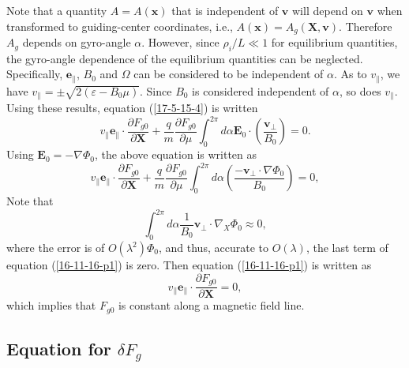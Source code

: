 \documentclass{llncs}
\begin{document}
Note that a quantity $A = A (\mathbf{x})$ that is independent of $\mathbf{v}$
will depend on $\mathbf{v}$ when transformed to guiding-center coordinates,
i.e., $A (\mathbf{x}) = A_g (\mathbf{X}, \mathbf{v})$. Therefore $A_g$ depends
on gyro-angle $\alpha$. However, since $\rho_i / L \ll 1$ for equilibrium
quantities, the gyro-angle dependence of the equilibrium quantities can be
neglected. Specifically, $\mathbf{e}_{\parallel}$, $B_0$ and $\Omega$ can be
considered to be independent of $\alpha$. As to $v_{\parallel}$, we have
$v_{\parallel} = \pm \sqrt{2 (\varepsilon - B_0 \mu)}$. Since $B_0$ is
considered independent of $\alpha$, so does $v_{\parallel}$. Using these
results, equation (\ref{17-5-15-4}) is written
\begin{equation}
  v_{\parallel} \mathbf{e}_{\parallel} \cdot \frac{\partial F_{g 0}}{\partial
  \mathbf{X}} + \frac{q}{m}  \frac{\partial F_{g 0}}{\partial \mu} \int_0^{2
  \pi} d \alpha \mathbf{E}_0 \cdot \left( \frac{\mathbf{v}_{\perp}}{B_0}
  \right) = 0.
\end{equation}
Using $\mathbf{E}_0 = - \nabla \Phi_0$, the above equation is written as
\begin{equation}
  \label{16-11-16-p1} v_{\parallel} \mathbf{e}_{\parallel} \cdot
  \frac{\partial F_{g 0}}{\partial \mathbf{X}} + \frac{q}{m}  \frac{\partial
  F_{g 0}}{\partial \mu} \int_0^{2 \pi} d \alpha \left(
  \frac{-\mathbf{v}_{\perp} \cdot \nabla \Phi_0}{B_0}  \right) = 0,
\end{equation}
Note that
\begin{equation}
  \int_0^{2 \pi} d \alpha \frac{1}{B_0} \mathbf{v}_{\perp} \cdot \nabla_X
  \Phi_0 \approx 0,
\end{equation}
where the error is of $O (\lambda^2) \Phi_0$, and thus, accurate to $O
(\lambda)$, the last term of equation (\ref{16-11-16-p1}) is zero. Then
equation (\ref{16-11-16-p1}) is written as
\begin{equation}
  v_{\parallel} \mathbf{e}_{\parallel} \cdot \frac{\partial F_{g 0}}{\partial
  \mathbf{X}} = 0,
\end{equation}
which implies that $F_{g 0}$ is constant along a magnetic field line.

\subsection{Equation for $\delta F_g$}
\end{document}
